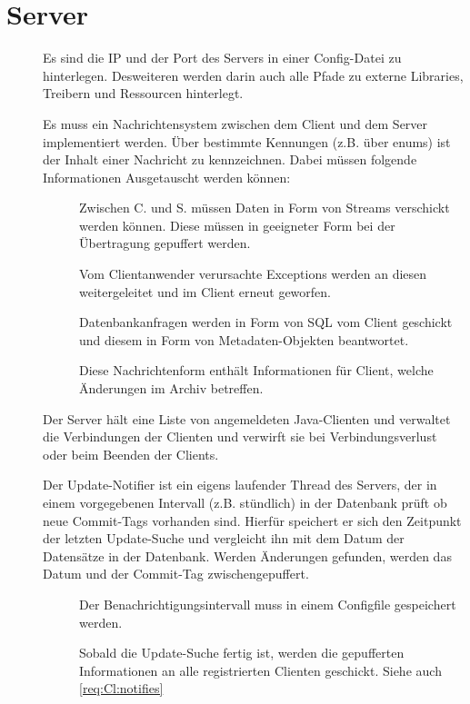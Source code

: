 \section{Server} \label{spec:server}
\begin{description}
	\item []
		Es sind die IP und der Port des Servers in einer Config-Datei zu hinterlegen.
		Desweiteren werden darin auch alle Pfade zu externe Libraries, Treibern und Ressourcen
		hinterlegt.
	\item []
		Es muss ein Nachrichtensystem zwischen dem Client und dem Server implementiert werden.
		Über bestimmte Kennungen (z.B. über enums) ist der Inhalt einer Nachricht zu kennzeichnen.
		Dabei müssen folgende Informationen Ausgetauscht werden können:
		\begin{description}
	\item []
		Zwischen C. und S. müssen Daten in Form von Streams verschickt werden können.
		Diese müssen in geeigneter Form bei der Übertragung gepuffert werden.
	\item []
		Vom Clientanwender verursachte Exceptions werden an diesen weitergeleitet und 
		im Client erneut geworfen.
	\item []
		Datenbankanfragen werden in Form von SQL vom Client geschickt und diesem
		in Form von Metadaten-Objekten beantwortet.
	\item []
		Diese Nachrichtenform enthält Informationen für Client, welche Änderungen im Archiv betreffen.
\end{description}
	\item []
		Der Server hält eine Liste von angemeldeten Java-Clienten und 
		verwaltet die Verbindungen der Clienten und verwirft sie bei Verbindungsverlust oder 
		beim Beenden der Clients. 
	\item []
		Der Update-Notifier ist ein eigens laufender Thread des Servers, der in einem vorgegebenen Intervall (z.B. stündlich) in der Datenbank prüft ob neue Commit-Tags vorhanden sind.
		Hierfür speichert er sich den Zeitpunkt der letzten Update-Suche und vergleicht ihn mit dem Datum der Datensätze in der Datenbank.
		Werden Änderungen gefunden, werden das Datum und der Commit-Tag zwischengepuffert.
		\begin{description}
			\item []
				Der Benachrichtigungsintervall muss in einem Configfile gespeichert werden.
			\item []
				Sobald die Update-Suche fertig ist, 
				werden die gepufferten Informationen an alle registrierten Clienten geschickt.
				Siehe auch \ref{req:Cl:notifies}
		\end{description}
\end{description}

